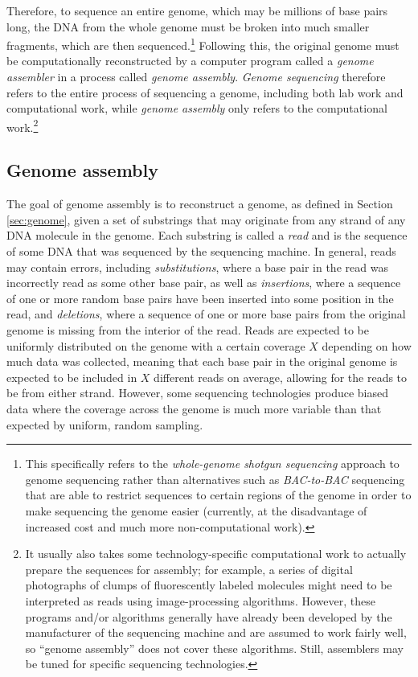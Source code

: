 \documentclass[12pt]{article}
\newcommand{\Section}[1]{Section \ref{#1}}
\newcommand{\KeyTerm}[1]{{\it #1}}
\begin{document}
Therefore, to sequence an entire genome, which may be millions of base pairs
long, the DNA from the whole genome must be broken into much smaller fragments,
which are then sequenced.\footnote{This specifically refers to the
\KeyTerm{whole-genome shotgun sequencing} approach to genome sequencing rather
than alternatives such as \KeyTerm{BAC-to-BAC} sequencing that are able to
restrict sequences to certain regions of the genome in order to make sequencing
the genome easier (currently, at the disadvantage of increased cost and much more
non-computational work).} Following this, the original genome must be
computationally reconstructed by a computer program called a \KeyTerm{genome
assembler} in a process called \KeyTerm{genome assembly}.  \KeyTerm{Genome
sequencing} therefore refers to the entire process of sequencing a genome,
including both lab work and computational work, while \KeyTerm{genome assembly}
only refers to the computational work.\footnote{It usually also takes some
technology-specific computational work to actually prepare the sequences for
assembly; for example, a series of digital photographs of clumps of
fluorescently labeled molecules might need to be interpreted as reads using
image-processing algorithms.  However, these programs and/or algorithms
generally have already been developed by the manufacturer of the sequencing
machine and are assumed to work fairly well, so ``genome assembly'' does not cover these
algorithms.  Still, assemblers may be tuned for specific sequencing
technologies.}

\subsection{Genome assembly}

\label{subsec:reads}

The goal of genome assembly is to reconstruct a genome, as defined in
\Section{sec:genome}, given a set of substrings that may originate from any
strand of any DNA molecule in the genome.  Each substring is called a
\KeyTerm{read} and is the sequence of some DNA that was sequenced by the
sequencing machine.  In general, reads may contain errors, including
\KeyTerm{substitutions}, where a base pair in the read was incorrectly read as
some other base pair, as well as \KeyTerm{insertions}, where a sequence of one
or more random base pairs have been inserted into some position in the read, and
\KeyTerm{deletions}, where a sequence of one or more base pairs from the
original genome is missing from the interior of the read.  Reads are expected to
be uniformly distributed on the genome with a certain coverage $X$ depending on
how much data was collected, meaning that each base pair in the original genome
is expected to be included in $X$ different reads on average, allowing for the
reads to be from either strand.  However, some sequencing technologies produce
biased data where the coverage across the genome is much more variable than that
expected by uniform, random sampling.
\end{document}
